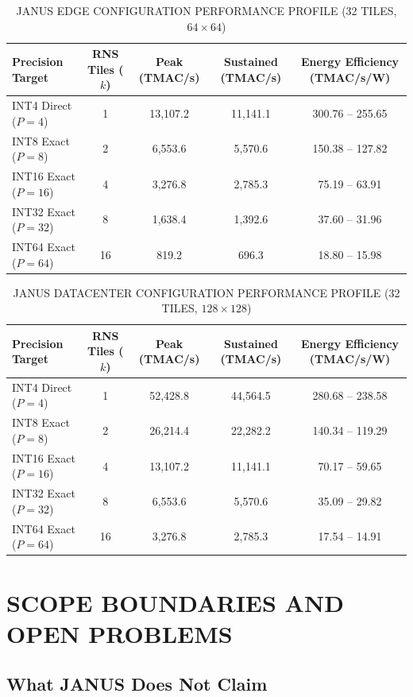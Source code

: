 \documentclass[journal]{IEEEtran}
\begin{document}
\begin{table}[htbp]
\centering
\small
\setlength{\tabcolsep}{3pt}
\caption{JANUS EDGE CONFIGURATION PERFORMANCE PROFILE (32 TILES, $64 \times 64$)}
\label{tab:table17}
\begin{tabular}{lcccc}
\toprule
Precision Target & RNS Tiles ($k$) & Peak (TMAC/s) & Sustained (TMAC/s) & Energy Efficiency (TMAC/s/W) \\
\midrule
INT4 Direct ($P=4$) & 1 & 13,107.2 & 11,141.1 & 300.76 -- 255.65 \\
INT8 Exact ($P=8$) & 2 & 6,553.6 & 5,570.6 & 150.38 -- 127.82 \\
INT16 Exact ($P=16$) & 4 & 3,276.8 & 2,785.3 & 75.19 -- 63.91 \\
INT32 Exact ($P=32$) & 8 & 1,638.4 & 1,392.6 & 37.60 -- 31.96 \\
INT64 Exact ($P=64$) & 16 & 819.2 & 696.3 & 18.80 -- 15.98 \\
\bottomrule
\end{tabular}
\end{table}

\begin{table}[htbp]
\centering
\small
\setlength{\tabcolsep}{3pt}
\caption{JANUS DATACENTER CONFIGURATION PERFORMANCE PROFILE (32 TILES, $128 \times 128$)}
\label{tab:table18}
\begin{tabular}{lcccc}
\toprule
Precision Target & RNS Tiles ($k$) & Peak (TMAC/s) & Sustained (TMAC/s) & Energy Efficiency (TMAC/s/W) \\
\midrule
INT4 Direct ($P=4$) & 1 & 52,428.8 & 44,564.5 & 280.68 -- 238.58 \\
INT8 Exact ($P=8$) & 2 & 26,214.4 & 22,282.2 & 140.34 -- 119.29 \\
INT16 Exact ($P=16$) & 4 & 13,107.2 & 11,141.1 & 70.17 -- 59.65 \\
INT32 Exact ($P=32$) & 8 & 6,553.6 & 5,570.6 & 35.09 -- 29.82 \\
INT64 Exact ($P=64$) & 16 & 3,276.8 & 2,785.3 & 17.54 -- 14.91 \\
\bottomrule
\end{tabular}
\end{table}

\section{SCOPE BOUNDARIES AND OPEN PROBLEMS}
\label{app:open_problems}

\subsection{\textbf{What JANUS Does Not Claim}}
\end{document}
